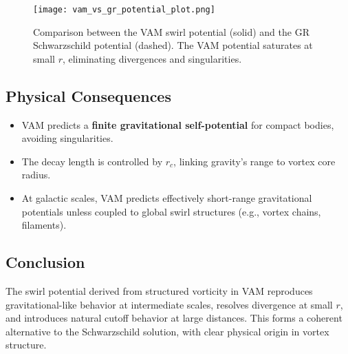 \begin{figure}[H]
    \centering
    \texttt{[image: vam\_vs\_gr\_potential\_plot.png]}
    \caption{Comparison between the VAM swirl potential (solid) and the GR Schwarzschild potential (dashed). The VAM potential saturates at small \( r \), eliminating divergences and singularities.}
\end{figure}

\subsection{Physical Consequences}

\begin{itemize}
    \item VAM predicts a \textbf{finite gravitational self-potential} for compact bodies, avoiding singularities.
    \item The decay length is controlled by \( r_c \), linking gravity's range to vortex core radius.
    \item At galactic scales, VAM predicts effectively short-range gravitational potentials unless coupled to global swirl structures (e.g., vortex chains, filaments).
\end{itemize}

\subsection{Conclusion}

The swirl potential derived from structured vorticity in VAM reproduces gravitational-like behavior at intermediate scales, resolves divergence at small \( r \), and introduces natural cutoff behavior at large distances. This forms a coherent alternative to the Schwarzschild solution, with clear physical origin in vortex structure.
